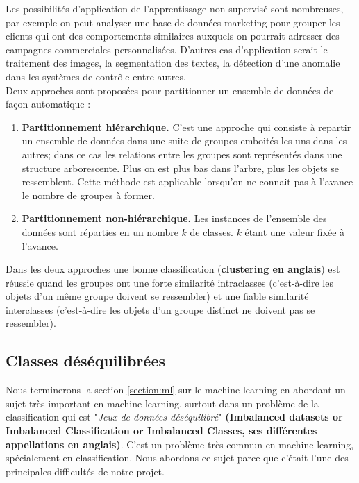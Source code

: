 \documentclass[12pt, french]{report}
\begin{document}
 Les possibilités d'application de l'apprentissage non-supervisé sont nombreuses, par exemple on peut analyser une base de données marketing pour grouper les clients qui ont des comportements similaires auxquels on pourrait adresser des campagnes commerciales personnalisées. D'autres cas d'application serait le traitement des images, la segmentation des textes, la détection d'une anomalie dans les systèmes de contrôle entre autres.  \cite{key41, key44}\\
 
 Deux approches sont proposées pour partitionner un ensemble de données de façon automatique :
 \begin{enumerate}
 	\item \textbf{Partitionnement hiérarchique.} C'est une approche qui consiste à repartir un ensemble de données dans une suite de groupes emboités les uns dans les autres; dans ce cas les relations entre les groupes sont représentés dans une structure arborescente. Plus on est plus bas dans l'arbre, plus les objets se ressemblent. Cette méthode est applicable lorsqu'on ne connait pas à l'avance le nombre de groupes à former.
 	\item \textbf{Partitionnement non-hiérarchique.} Les instances de l'ensemble des données sont réparties en un nombre $k$ de classes. $k$ étant une valeur fixée à l'avance. 
 \end{enumerate}  
 
 Dans les deux approches une bonne classification (\textbf{clustering en anglais}) est réussie quand les groupes ont une forte similarité intraclasses (c'est-à-dire les objets d'un même groupe doivent se ressembler) et une fiable similarité interclasses (c'est-à-dire les objets d'un groupe distinct ne doivent pas se ressembler). \cite[p.~86]{key44}


   
\subsection{Classes déséquilibrées}

Nous terminerons la section \ref{section:ml} sur le machine learning en abordant un sujet très important en machine learning, surtout dans un problème de la classification qui est "\textit{Jeux de données déséquilibré}" \textbf{(Imbalanced datasets or Imbalanced Classification or Imbalanced Classes, ses différentes appellations en anglais)}. C'est un problème très commun en machine learning, spécialement en classification. Nous abordons ce sujet parce que c'était l'une des principales difficultés de notre projet. \\
\end{document}
